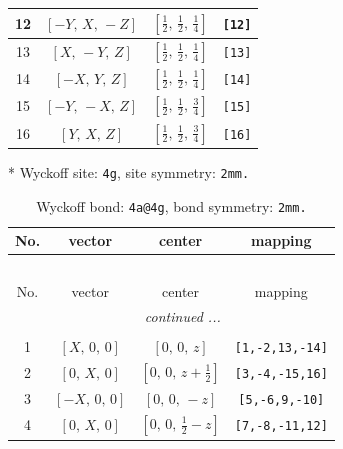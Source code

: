 \documentclass[fleqn,8pt]{jsarticle}
\begin{document}
\begin{longtable}{cccc}
12 & $\left[ - Y,\, X,\, - Z \right]$ & $\left[ \frac{1}{2},\, \frac{1}{2},\, \frac{1}{4} \right]$ & {\tt [12]} \\ \hline
13 & $\left[ X,\, - Y,\, Z \right]$ & $\left[ \frac{1}{2},\, \frac{1}{2},\, \frac{1}{4} \right]$ & {\tt [13]} \\ \hline
14 & $\left[ - X,\, Y,\, Z \right]$ & $\left[ \frac{1}{2},\, \frac{1}{2},\, \frac{1}{4} \right]$ & {\tt [14]} \\ \hline
15 & $\left[ - Y,\, - X,\, Z \right]$ & $\left[ \frac{1}{2},\, \frac{1}{2},\, \frac{3}{4} \right]$ & {\tt [15]} \\ \hline
16 & $\left[ Y,\, X,\, Z \right]$ & $\left[ \frac{1}{2},\, \frac{1}{2},\, \frac{3}{4} \right]$ & {\tt [16]} \\
\end{longtable}
* Wyckoff site: {\tt 4g}, site symmetry: {\tt 2mm.}
\renewcommand{\arraystretch}{1.2}
\begin{longtable}{cccc}
\caption{Wyckoff bond: {\tt 4a@4g}, bond symmetry: {\tt 2mm.}}
 \\
 \hline \hline
No. & vector & center & mapping \\ \hline \endfirsthead

\multicolumn{3}{l}{\tablename\ \thetable{}} \\
 \hline \hline
No. & vector & center & mapping \\ \hline \endhead

 \hline \hline
\multicolumn{3}{r}{\footnotesize\it continued ...} \\ \endfoot

 \hline \hline
\multicolumn{3}{r}{} \\ \endlastfoot

1 & $\left[ X,\, 0,\, 0 \right]$ & $\left[ 0,\, 0,\, z \right]$ & {\tt [1,-2,13,-14]} \\ \hline
2 & $\left[ 0,\, X,\, 0 \right]$ & $\left[ 0,\, 0,\, z + \frac{1}{2} \right]$ & {\tt [3,-4,-15,16]} \\ \hline
3 & $\left[ - X,\, 0,\, 0 \right]$ & $\left[ 0,\, 0,\, - z \right]$ & {\tt [5,-6,9,-10]} \\ \hline
4 & $\left[ 0,\, X,\, 0 \right]$ & $\left[ 0,\, 0,\, \frac{1}{2} - z \right]$ & {\tt [7,-8,-11,12]} \\
\end{longtable}
\renewcommand{\arraystretch}{1.2}
\end{document}
